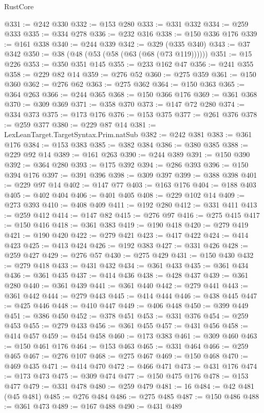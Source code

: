 \begin{lexlean}{RustCore}
\begin{coremodule}
@331 := @242 @330
@332 := @153 @280
@333 := @331 @332
@334 := @259 @333
@335 := @334 @278
@336 := @232 @316
@338 := @150 @336 @176
@339 := @161 @338
@340 := @244 @339
@342 := @329 (@335 @340)
@343 := @37 @342
@350 := @38 (@48 (@53 (@58 (@63 (@68 (@73 @119))))))
@351 := @15 @226
@353 := @350 @351 @145
@355 := @233 @162 @47
@356 := @241 @355
@358 := @229 @82 @14
@359 := @276 @52
@360 := @275 @359
@361 := @150 @360
@362 := @276 @62
@363 := @275 @362
@364 := @150 @363
@365 := @364 @263
@366 := @244 @365
@368 := @150 @366 @176
@369 := @361 @368
@370 := @309 @369
@371 := @358 @370
@373 := @147 @72 @280
@374 := @334 @373
@375 := @173 @176
@376 := @153 @375
@377 := @261 @376
@378 := @259 @377
@380 := @229 @87 @14
@381 := LexLeanTarget.TargetSyntax.Prim.natSub
@382 := @242 @381
@383 := @361 @176
@384 := @153 @383
@385 := @382 @384
@386 := @380 @385
@388 := @229 @92 @14
@389 := @161 @263
@390 := @244 @389
@391 := @150 @390
@392 := @364 @280
@393 := @175 @392
@394 := @286 @393
@396 := @150 @394 @176
@397 := @391 @396
@398 := @309 @397
@399 := @388 @398
@401 := @229 @97 @14
@402 := @147 @77
@403 := @163 @176
@404 := @188 @403
@405 := @402 @404
@406 := @401 @405
@408 := @229 @102 @14
@409 := @273 @393
@410 := @408 @409
@411 := @192 @280
@412 := @331 @411
@413 := @259 @412
@414 := @147 @82
@415 := @276 @97
@416 := @275 @415
@417 := @150 @416
@418 := @361 @383
@419 := @190 @418
@420 := @279 @419
@421 := @190 @420
@422 := @279 @421
@423 := @417 @422
@424 := @414 @423
@425 := @413 @424
@426 := @192 @383
@427 := @331 @426
@428 := @259 @427
@429 := @276 @57
@430 := @275 @429
@431 := @150 @430
@432 := @279 @418
@433 := @431 @432
@434 := @361 @433
@435 := @361 @434
@436 := @361 @435
@437 := @414 @436
@438 := @428 @437
@439 := @361 @280
@440 := @361 @439
@441 := @361 @440
@442 := @279 @441
@443 := @361 @442
@444 := @279 @443
@445 := @414 @444
@446 := @438 @445
@447 := @425 @446
@448 := @410 @447
@449 := @406 @448
@450 := @399 @449
@451 := @386 @450
@452 := @378 @451
@453 := @331 @376
@454 := @259 @453
@455 := @279 @433
@456 := @361 @455
@457 := @431 @456
@458 := @414 @457
@459 := @454 @458
@460 := @173 @383
@461 := @309 @460
@463 := @150 @461 @176
@464 := @153 @463
@465 := @331 @464
@466 := @259 @465
@467 := @276 @107
@468 := @275 @467
@469 := @150 @468
@470 := @469 @435
@471 := @414 @470
@472 := @466 @471
@473 := @431 @176
@474 := @173 @473
@475 := @309 @474
@477 := @150 @475 @176
@478 := @153 @477
@479 := @331 @478
@480 := @259 @479
@481 := 16
@484 := @42 @481 (@45 @481)
@485 := @276 @484
@486 := @275 @485
@487 := @150 @486
@488 := @361 @473
@489 := @167 @488
@490 := @431 @489

\end{coremodule}
\end{lexlean}
